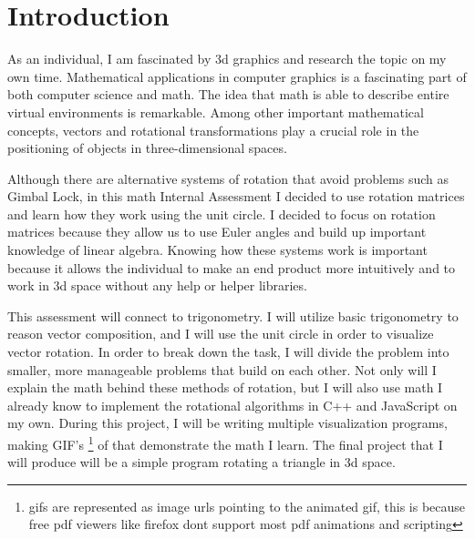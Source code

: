 \tableofcontents %

\thispagestyle{empty} %

\section*{Introduction}


\hspace{\parindent}%
As an individual, I am fascinated by 3d graphics and research the topic on my own time. Mathematical applications in computer graphics is a fascinating part of both computer science and math. The idea that math is able to describe entire virtual environments is remarkable. Among other important mathematical concepts, vectors and rotational transformations play a crucial role in the positioning of objects in three-dimensional spaces.

Although there are alternative systems of rotation that avoid problems such as Gimbal Lock, in this math Internal Assessment I decided to use rotation matrices and learn how they work using the unit circle. I decided to focus on rotation matrices because they allow us to use Euler angles and build up important knowledge of linear algebra. Knowing how these systems work is important because it allows the individual to make an end product more intuitively and to work in 3d space without any help or helper libraries.

This assessment will connect to trigonometry. I will utilize basic trigonometry to reason vector composition, and I will use the unit circle in order to visualize vector rotation. In order to break down the task, I will divide the problem into smaller, more manageable problems that build on each other. Not only will I explain the math behind these methods of rotation, but I will also use math I already know to implement the rotational algorithms in C++ and JavaScript on my own. During this project, I will be writing multiple visualization programs, making GIF's 
\footnote{gifs are represented as image urls pointing to the animated gif, this is because free pdf viewers like firefox dont support most pdf animations and scripting}
of that demonstrate the math I learn.  The final project that I will produce will be a simple program rotating a triangle in 3d space.

